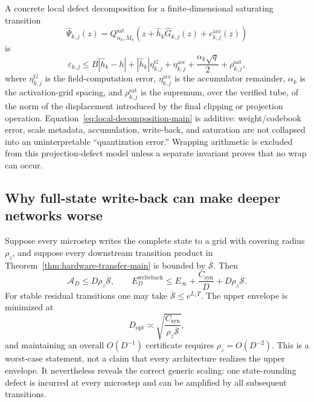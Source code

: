 \documentclass[twoside,11pt]{article}
\begin{document}
A concrete local defect decomposition for a finite-dimensional saturating transition
\begin{equation}
 \widehat\Psi_{k,j}(z)
 =Q^{\mathrm{sat}}_{\alpha_k,M_k}
 \left(z+\widehat h_k\widehat G_{k,j}(z)+e^{\mathrm{acc}}_{k,j}(z)\right)
 \label{eq:saturating-transition-main}
\end{equation}
is
\begin{equation}
 \varepsilon_{k,j}
 \le B|\widehat h_k-h|
 +|\widehat h_k|\eta^G_{k,j}
 +\eta^{\mathrm{acc}}_{k,j}
 +\frac{\alpha_k\sqrt q}{2}
 +\rho^{\mathrm{sat}}_{k,j},
 \label{eq:local-decomposition-main}
\end{equation}
where $\eta^G_{k,j}$ is the field-computation error, $\eta^{\mathrm{acc}}_{k,j}$ is the accumulator remainder, $\alpha_k$ is the activation-grid spacing, and $\rho^{\mathrm{sat}}_{k,j}$ is the supremum, over the verified tube, of the norm of the displacement introduced by the final clipping or projection operation.  Equation~\eqref{eq:local-decomposition-main} is additive: weight/codebook error, scale metadata, accumulation, write-back, and saturation are not collapsed into an uninterpretable ``quantization error.''  Wrapping arithmetic is excluded from this projection-defect model unless a separate invariant proves that no wrap can occur.

\subsection{Why full-state write-back can make deeper networks worse}

Suppose every microstep writes the complete state to a grid with covering radius $\rho_z$, and suppose every downstream transition product in Theorem~\ref{thm:hardware-transfer-main} is bounded by $\overline{\mathcal S}$.  Then
\begin{equation}
 \mathcal A_D\le D\rho_z\overline{\mathcal S},
 \qquad
 E_D^{\mathrm{writeback}}
 \le E_\infty+\frac{C_{\mathrm{syn}}}{D}
     +D\rho_z\overline{\mathcal S}.
 \label{eq:writeback-envelope-main}
\end{equation}
For stable residual transitions one may take $\overline{\mathcal S}\le e^{L_zT}$.  The upper envelope is minimized at
\begin{equation}
 D_{\mathrm{opt}}
 \asymp\sqrt{\frac{C_{\mathrm{syn}}}
 {\rho_z\overline{\mathcal S}}},
 \label{eq:writeback-optimal-depth-main}
\end{equation}
and maintaining an overall $O(D^{-1})$ certificate requires $\rho_z=O(D^{-2})$.  This is a worst-case statement, not a claim that every architecture realizes the upper envelope.  It nevertheless reveals the correct generic scaling: one state-rounding defect is incurred at every microstep and can be amplified by all subsequent transitions.
\end{document}
